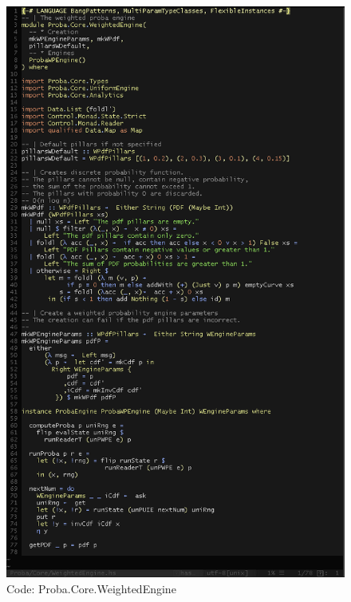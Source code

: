 \documentclass[12pt,a4paper,titlepage]{article}
\begin{document}
\begin{figure}[h!]
\centering
\includegraphics[width=1\textwidth]{img/code-we.png}
\caption{Code: Proba.Core.WeightedEngine}
\label{fig:core.we}
\end{figure}
\end{document}
